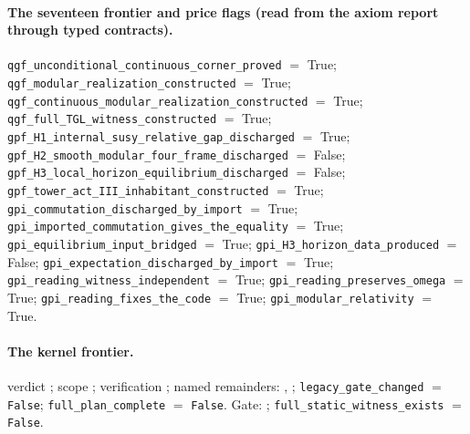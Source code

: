 \documentclass[11pt]{article}
\theoremstyle{definition}\newtheorem{deriv}{Derivation}
\begin{document}
\paragraph*{The seventeen frontier and price flags (read from the axiom report through typed contracts).} \texttt{qgf\_unconditional\_continuous\_corner\_proved} $=$ True; \texttt{qgf\_modular\_realization\_constructed} $=$ True; \texttt{qgf\_continuous\_modular\_realization\_constructed} $=$ True; \texttt{qgf\_full\_TGL\_witness\_constructed} $=$ True; \texttt{gpf\_H1\_internal\_susy\_relative\_gap\_discharged} $=$ True; \texttt{gpf\_H2\_smooth\_modular\_four\_frame\_discharged} $=$ False; \texttt{gpf\_H3\_local\_horizon\_equilibrium\_discharged} $=$ False; \texttt{gpf\_tower\_act\_III\_inhabitant\_constructed} $=$ True; \texttt{gpi\_commutation\_discharged\_by\_import} $=$ True; \texttt{gpi\_imported\_commutation\_gives\_the\_equality} $=$ True; \texttt{gpi\_equilibrium\_input\_bridged} $=$ True; \texttt{gpi\_H3\_horizon\_data\_produced} $=$ False; \texttt{gpi\_expectation\_discharged\_by\_import} $=$ True; \texttt{gpi\_reading\_witness\_independent} $=$ True; \texttt{gpi\_reading\_preserves\_omega} $=$ True; \texttt{gpi\_reading\_fixes\_the\_code} $=$ True; \texttt{gpi\_modular\_relativity} $=$ True.

\paragraph*{The kernel frontier.} verdict ; scope ; verification ; named remainders: , ; \texttt{legacy\_gate\_changed} $=$ \texttt{False}; \texttt{full\_plan\_complete} $=$ \texttt{False}. Gate: ; \texttt{full\_static\_witness\_exists} $=$ \texttt{False}.
\end{document}
